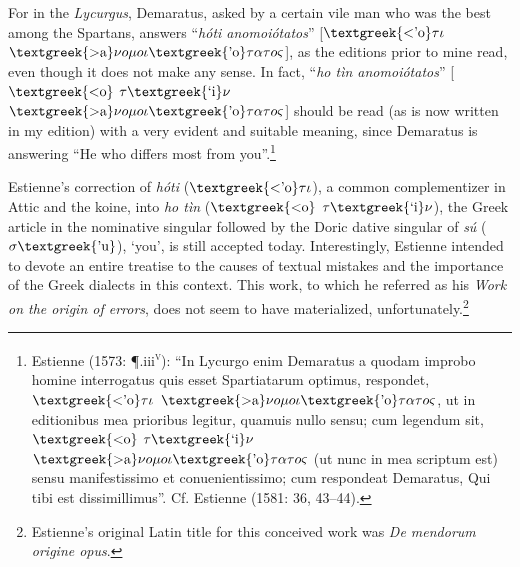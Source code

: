 \documentclass[12pt]{article}
\newenvironment{styleStandard}{\renewcommand\baselinestretch{1.25}\setlength\leftskip{0in}\setlength\rightskip{0in}\setlength\parindent{0.1972in}\setlength\parfillskip{0pt plus 1fil}\setlength\parskip{0in plus 1pt}\writerlistparindent\writerlistleftskip\leavevmode\normalfont\normalsize\writerlistlabel\ignorespaces}{\unskip\vspace{0in plus 1pt}\par}
\newenvironment{styleQuote}{\renewcommand\baselinestretch{1.25}\setlength\leftskip{0.3937in}\setlength\rightskip{0in}\setlength\parindent{0in}\setlength\parfillskip{0pt plus 1fil}\setlength\parskip{0.1665in plus 0.016649999in}\writerlistparindent\writerlistleftskip\leavevmode\normalfont\normalsize\writerlistlabel\ignorespaces}{\unskip\vspace{0.1665in plus 0.016649999in}\par}
\newcommand\writerlistleftskip{}
\newcommand\writerlistparindent{}
\newcommand\writerlistlabel{}
\begin{document}
\begin{styleQuote}
For in the \textit{Lycurgus}, Demaratus, asked by a certain vile man who was the best among the Spartans, answers “\textit{hóti anomoiótatos}” [$\text{\textgreek{<'o}}\tau \iota $ $\text{\textgreek{>a}}\nu o\mu o\iota \text{\textgreek{'o}}\tau \alpha \tau o\varsigma $], as the editions prior to mine read, even though it does not make any sense. In fact, “\textit{ho tìn anomoiótatos}” [$\text{\textgreek{<o}}$ $\tau \text{\textgreek{`i}}\nu $ $\text{\textgreek{>a}}\nu o\mu o\iota \text{\textgreek{'o}}\tau \alpha \tau o\varsigma $] should be read (as is now written in my edition) with a very evident and suitable meaning, since Demaratus is answering “He who differs most from you”.\footnote{ Estienne (1573: ¶.iii\textsc{\textsuperscript{v}}): “In Lycurgo enim Demaratus a quodam improbo homine interrogatus quis esset Spartiatarum optimus, respondet, $\text{\textgreek{<'o}}\tau \iota $ $\text{\textgreek{>a}}\nu o\mu o\iota \text{\textgreek{'o}}\tau \alpha \tau o\varsigma $, ut in editionibus mea prioribus legitur, quamuis nullo sensu; cum legendum sit, $\text{\textgreek{<o}}$ $\tau \text{\textgreek{`i}}\nu $ $\text{\textgreek{>a}}\nu o\mu o\iota \text{\textgreek{'o}}\tau \alpha \tau o\varsigma $ (ut nunc in mea scriptum est) sensu manifestissimo et conuenientissimo; cum respondeat Demaratus, Qui tibi est dissimillimus”. Cf. Estienne (1581: 36, 43–44).}
\end{styleQuote}

\begin{styleStandard}
Estienne’s correction of \textit{hóti }($\text{\textgreek{<'o}}\tau \iota $), a common complementizer in Attic and the koine, into \textit{ho tìn} ($\text{\textgreek{<o}}$ $\tau \text{\textgreek{`i}}\nu $), the Greek article in the nominative singular followed by the Doric dative singular of \textit{sú} ($\sigma \text{\textgreek{'u}}$), ‘you’, is still accepted today. Interestingly, Estienne intended to devote an entire treatise to the causes of textual mistakes and the importance of the Greek dialects in this context. This work, to which he referred as his \textit{Work on the origin of errors}, does not seem to have materialized, unfortunately.\footnote{ Estienne’s original Latin title for this conceived work was \textit{De mendorum origine opus}.}
\end{styleStandard}
\end{document}
